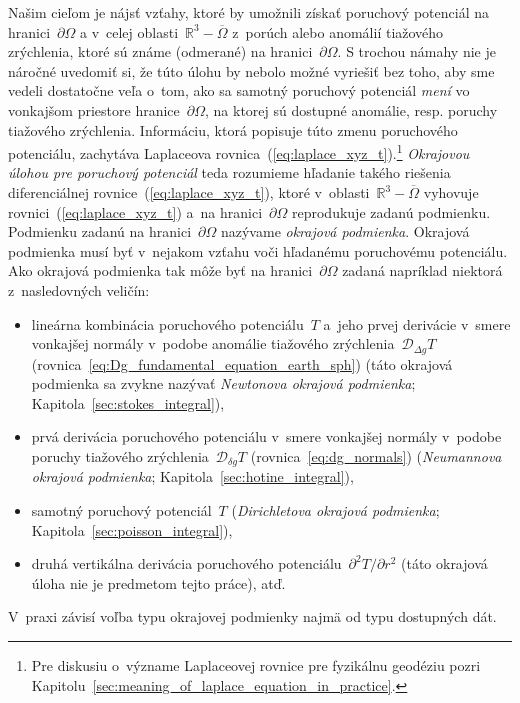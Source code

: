 \documentclass[a4paper,12pt]{book}
\newcommand{\DIFF}{\mathcal D}
\begin{document}
Našim cieľom je nájsť vzťahy, ktoré by umožnili získať poruchový potenciál na 
hranici~$\partial \Omega$ a v~celej oblasti~$\mathbb{R}^3 - \overline{\Omega}$ 
z~porúch alebo anomálií tiažového zrýchlenia, ktoré sú známe (odmerané) na 
hranici~$\partial \Omega$.  S trochou námahy nie je náročné uvedomiť si, že 
túto úlohu by nebolo možné vyriešiť bez toho, aby sme vedeli dostatočne veľa 
o~tom, ako sa samotný poruchový potenciál \emph{mení} vo vonkajšom priestore 
hranice~$\partial\Omega$, na ktorej sú dostupné anomálie, resp. poruchy 
tiažového zrýchlenia.  Informáciu, ktorá popisuje túto zmenu poruchového 
potenciálu, zachytáva Laplaceova rovnica~(\ref{eq:laplace_xyz_t}).\footnote{Pre 
diskusiu o~význame Laplaceovej rovnice pre fyzikálnu geodéziu pozri 
Kapitolu~\ref{sec:meaning_of_laplace_equation_in_practice}.}  \emph{Okrajovou 
úlohou pre poruchový potenciál} teda rozumieme hľadanie takého riešenia 
diferenciálnej rovnice~(\ref{eq:laplace_xyz_t}), ktoré v~oblasti~$\mathbb{R}^3 
- \overline\Omega$ vyhovuje rovnici~(\ref{eq:laplace_xyz_t}) a~na 
hranici~$\partial \Omega$ reprodukuje zadanú podmienku.  Podmienku zadanú na 
hranici~$\partial \Omega$ nazývame \emph{okrajová podmienka}.  Okrajová 
podmienka musí byť v~nejakom vzťahu voči hľadanému poruchovému potenciálu.  Ako 
okrajová podmienka tak môže byť na hranici~$\partial \Omega$ zadaná napríklad 
niektorá z~nasledovných veličín:
%
\begin{itemize}
\item lineárna kombinácia poruchového potenciálu~$T$ a~jeho prvej derivácie 
v~smere vonkajšej normály v~podobe anomálie tiažového zrýchlenia~$\DIFF_{\Delta 
g}T$ (rovnica~\ref{eq:Dg_fundamental_equation_earth_sph}) (táto okrajová 
podmienka sa zvykne nazývať \emph{Newtonova okrajová podmienka}; 
Kapitola~\ref{sec:stokes_integral}),
%
\item prvá derivácia poruchového potenciálu v~smere vonkajšej normály v~podobe 
poruchy tiažového zrýchlenia~$\DIFF_{\delta g} T$ (rovnica~\ref{eq:dg_normals}) 
(\emph{Neumannova okrajová podmienka}; Kapitola~\ref{sec:hotine_integral}),
%
\item samotný poruchový potenciál~$T$ (\emph{Dirichletova okrajová podmienka}; 
Kapitola~\ref{sec:poisson_integral}),
%
\item druhá vertikálna derivácia poruchového potenciálu~$\partial^2 
T / \partial r^2$ (táto okrajová úloha nie je predmetom tejto práce), atď.
\end{itemize}
%
V~praxi závisí voľba typu okrajovej podmienky najmä od typu dostupných dát.
\end{document}
